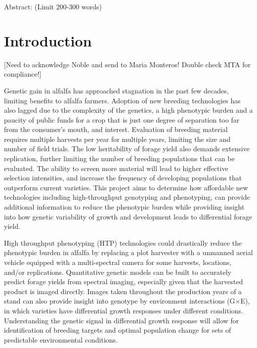 \documentclass[12pt, letterpaper]{article}
\newcommand{\GxE}{G$\times$E}
\begin{document}
Abstract: (Limit 200-300 words)

\section{Introduction}

[Need to acknowledge Noble and send to Maria Monteros! Double check MTA for compliance!]

Genetic gain in alfalfa has approached stagnation in the past few decades, limiting benefits to alfalfa farmers. Adoption of new breeding technologies has also lagged due to the complexity of the genetics, a high phenotypic burden and a paucity of public funds for a crop that is just one degree of separation too far from the consumer's mouth, and interest. Evaluation of breeding material requires multiple harvests per year for multiple years, limiting the size and number of field trials. The low heritability of forage yield also demands extensive replication, further limiting the number of breeding populations that can be evaluated. The ability to screen more material will lead to higher effective selection intensities, and increase the frequency of developing populations that outperform current varieties. This project aims to determine how affordable new technologies including high-throughput genotyping and phenotyping, can provide additional information to reduce the phenotypic burden while providing insight into how genetic variability of growth and development leads to differential forage yield. 

High throughput phenotyping (HTP) technologies could drastically reduce the phenotypic burden in alfalfa by replacing a plot harvester with a unmanned aerial vehicle equipped with a multi-spectral camera for some harvests, locations, and/or replications. Quantitative genetic models can be built to accurately predict forage yields from spectral imaging, especially given that the harvested product is imaged directly. Images taken throughout the production years of a stand can also provide insight into genotype by environment interactions (\GxE), in which varieties have differential growth responses under different conditions. Understanding the genetic signal in differential growth response will allow for identification of breeding targets and optimal population change for sets of predictable environmental conditions. 

\end{document}

